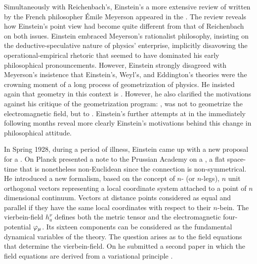 \documentclass[draft]{article}
\renewcommand{\me}{;~m.e.{}}
\newcommand{\nbein}{$n$-bein\xspace}
\newcommand{\vbein}{vierbein\xspace}
\newcommand{\hbein}{\ensuremath{h_{a}^{\nu}}\xspace}
\begin{document}
Simultaneously with Reichenbach's, Einstein's a more extensive review of  written by the French philosopher \'Emile Meyerson \citep{Meyerson1925} appeared in the \citet{Einstein1928b}. The review reveals how Einstein's point view had become quite different from that of Reichenbach on both issues. Einstein embraced Meyerson's rationalist philosophy, insisting on the deductive-speculative nature of physics' enterprise, implicitly disavowing the operational-empirical rhetoric that seemed to have dominated his early philosophical pronouncements. However, Einstein strongly disagreed with Meyerson's insistence that Einstein's, Weyl's, and Eddington's theories were the crowning moment of a long process of geometrization of physics. He insisted again that geometry in this context is  \citep[165\me]{Einstein1928b}. However, he also clarified the motivations against his critique of the geometrization program: , was not to geometrize the electromagnetic field, but to  \citep[165\me]{Einstein1928b}. Einstein's further attempts at \uft in the immediately following months reveal more clearly Einstein's motivations behind this change in philosophical attitude.


In Spring 1928, during a period of illness, Einstein came up with a new proposal for a \uft. On  Planck presented a note to the Prussian Academy on a  \citep{Einstein19281}, a flat space-time that is nonetheless non-Euclidean since the connection \Gtmn is non-symmetrical. He introduced a new formalism, based on the concept of $n$- (or $n$-legs), $n$ unit orthogonal vectors representing a local coordinate system attached to a point of $n$ dimensional continuum. Vectors at distance points considered as equal and parallel if they have the same local coordinates with respect to their \nbein. The \vbein-field \hbein defines both the metric tensor \gmn and the electromagnetic four-potential $\varphi_{\mu}$. Its sixteen components can be considered as the fundamental dynamical variables of the theory. The question arises as to the field equations that determine the \vbein-field. On  he submitted a second paper in which the field equations are derived from a variational principle \citep{Einstein19282}.
\end{document}
